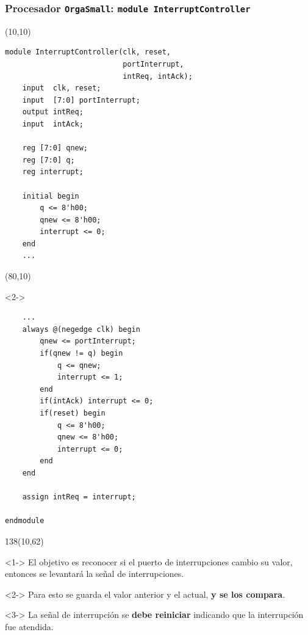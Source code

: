 \documentclass[aspectratio=169]{beamer}
\begin{document}
\begin{frame}[fragile,t]
    \frametitle{Procesador \texttt{OrgaSmall}: \texttt{module InterruptController}}
    \begin{textblock}{65}(10,10)
\lstset{basicstyle=\tiny}
\begin{lstlisting}
module InterruptController(clk, reset, 
                           portInterrupt, 
                           intReq, intAck);
    input  clk, reset;
    input  [7:0] portInterrupt;
    output intReq;
    input  intAck;
    
    reg [7:0] qnew;
    reg [7:0] q;
    reg interrupt;
    
    initial begin
        q <= 8'h00;
        qnew <= 8'h00;
        interrupt <= 0;        
    end
    ...
\end{lstlisting}
    \end{textblock}
    \begin{textblock}{65}(80,10)
    \begin{onlyenv}<2->
\lstset{basicstyle=\tiny}
\begin{lstlisting}
    ...
    always @(negedge clk) begin
        qnew <= portInterrupt;
        if(qnew != q) begin
            q <= qnew;
            interrupt <= 1;
        end
        if(intAck) interrupt <= 0;
        if(reset) begin
            q <= 8'h00;
            qnew <= 8'h00;
            interrupt <= 0;
        end 
    end
    
    assign intReq = interrupt;

endmodule
\end{lstlisting}
    \end{onlyenv}
    \end{textblock}
    \begin{textblock}{138}(10,62)
    \small
    \begin{onlyenv}<1->
     El objetivo es reconocer si el puerto de interrupciones cambio su valor, entonces se levantará la señal de interrupciones.
     \end{onlyenv}
     \begin{onlyenv}<2->
     \textcolor{verdeuca}{Para esto se guarda el valor anterior y el actual, \textbf{y se los compara}.\\}
    \end{onlyenv}
     \bigskip
     \begin{onlyenv}<3->
     La señal de interrupción se \textbf{debe reiniciar} indicando que la interrupción fue atendida.\\
     \end{onlyenv}
    \end{textblock}
\end{frame}
\end{document}
